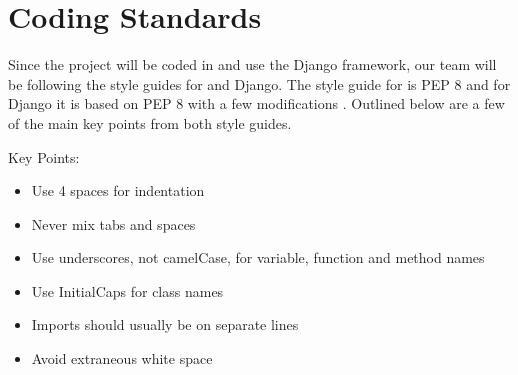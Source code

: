 \section{Coding Standards}
Since the project will be coded in  and use the \gls{Django} framework, our team will be following the style guides for  and \gls{Django}. The style guide for  is PEP 8 \cite{website:PEP8} and for \gls{Django} it is based on PEP 8 with a few modifications \cite{website:DjangoStyleGuide}. Outlined below are a few of the main key points from both style guides.

Key Points:
\begin{itemize}
\item Use 4 spaces for indentation
\item Never mix tabs and spaces
\item Use underscores, not camelCase, for variable, function and method names
\item Use InitialCaps for class names
\item Imports should usually be on separate lines
\item Avoid extraneous white space
\end{itemize}